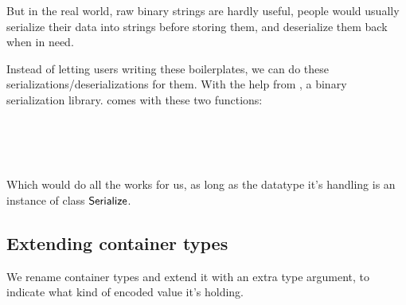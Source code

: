 But in the real world, raw binary strings are hardly useful, people would
 usually serialize their data into strings before storing them, and deserialize
 them back when in need.

Instead of letting users writing these boilerplates, we can do these
 serializations/deserializations for them. With the help from
 , a binary serialization library.
  comes with these two functions:

\begin{hscode}\SaveRestoreHook
{}%
%
%
\>[B]{}\mathbin{::}\;\<[E]%
\\
\>[B]{}\<[8]%
\>[8]{}\Rightarrow {}\to {}\;\<[E]%
\\[\blanklineskip]%
\>[B]{}\mathbin{::}\;\<[E]%
\\
\>[B]{}\<[8]%
\>[8]{}\Rightarrow {}\to {}\;\;\<[E]%
\ColumnHook
\end{hscode}\resethooks

Which would do all the works for us, as long as the datatype it's handling is
 an instance of class \ensuremath{\Conid{Serialize}}.\footnotemark


\subsection{Extending container types}
We rename container types and extend it with an extra type argument,
 to indicate what kind of encoded value it's holding.

\begin{hscode}\SaveRestoreHook
{}%
%
\>[B]{}\;\;\<[E]%
\\
\>[B]{}\;\;\<[E]%
\\
\>[B]{}\;\;\<[E]%
\\
\>[B]{}\<[E]%
\ColumnHook
\end{hscode}\resethooks

